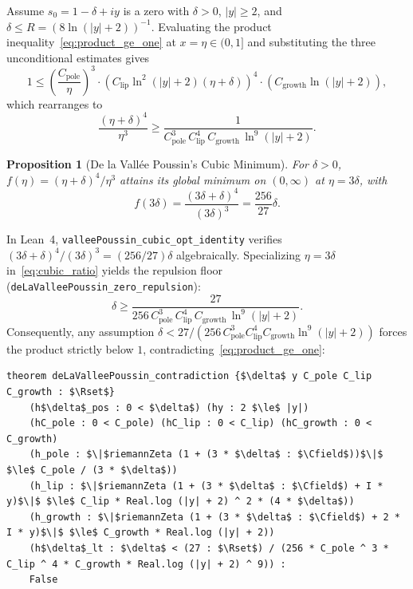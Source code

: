 \documentclass[11pt,a4paper]{article}
\newtheorem{proposition}[theorem]{Proposition}
\theoremstyle{definition}
\newcommand{\Rset}{\mathbb{R}}
\newcommand{\Cfield}{\mathbb{C}}
\begin{document}
Assume $s_0 = 1 - \delta + iy$ is a zero with $\delta > 0$, $|y| \ge 2$, and $\delta \le R = (8\ln(|y|+2))^{-1}$. Evaluating the product inequality~\eqref{eq:product_ge_one} at $x = \eta \in (0, 1]$ and substituting the three unconditional estimates gives
\begin{equation}
1 \le \left(\frac{C_{\text{pole}}}{\eta}\right)^3 \cdot \left(C_{\text{lip}} \ln^2(|y|+2) (\eta + \delta)\right)^4 \cdot \left(C_{\text{growth}} \ln(|y|+2)\right),
\end{equation}
which rearranges to
\begin{equation}\label{eq:cubic_ratio}
\frac{(\eta + \delta)^4}{\eta^3} \ge \frac{1}{C_{\text{pole}}^3 \, C_{\text{lip}}^4 \, C_{\text{growth}} \, \ln^9(|y|+2)}.
\end{equation}

\begin{proposition}[De la Vall{\'e}e Poussin's Cubic Minimum]\label{prop:cubic_opt}
For $\delta > 0$, $f(\eta) = (\eta+\delta)^4/\eta^3$ attains its global minimum on $(0,\infty)$ at $\eta = 3\delta$, with
\begin{equation}
f(3\delta) = \frac{(3\delta+\delta)^4}{(3\delta)^3} = \frac{256}{27}\delta.
\end{equation}
\end{proposition}
In Lean~4, \texttt{valleePoussin\_\allowbreak cubic\_opt\_identity} verifies $(3\delta + \delta)^4 / (3\delta)^3 = (256/27)\delta$ algebraically. Specializing $\eta = 3\delta$ in~\eqref{eq:cubic_ratio} yields the repulsion floor (\texttt{deLaValleePoussin\_\allowbreak zero\_repulsion}):
\begin{equation}
\delta \ge \frac{27}{256 \, C_{\text{pole}}^3 \, C_{\text{lip}}^4 \, C_{\text{growth}} \, \ln^9(|y|+2)}.
\end{equation}
Consequently, any assumption $\delta < 27 / (256\, C_{\text{pole}}^3 C_{\text{lip}}^4 C_{\text{growth}} \ln^9(|y|+2))$ forces the product strictly below $1$, contradicting~\eqref{eq:product_ge_one}:
\begin{lstlisting}
theorem deLaValleePoussin_contradiction {$\delta$ y C_pole C_lip C_growth : $\Rset$}
    (h$\delta$_pos : 0 < $\delta$) (hy : 2 $\le$ |y|)
    (hC_pole : 0 < C_pole) (hC_lip : 0 < C_lip) (hC_growth : 0 < C_growth)
    (h_pole : $\|$riemannZeta (1 + (3 * $\delta$ : $\Cfield$))$\|$ $\le$ C_pole / (3 * $\delta$))
    (h_lip : $\|$riemannZeta (1 + (3 * $\delta$ : $\Cfield$) + I * y)$\|$ $\le$ C_lip * Real.log (|y| + 2) ^ 2 * (4 * $\delta$))
    (h_growth : $\|$riemannZeta (1 + (3 * $\delta$ : $\Cfield$) + 2 * I * y)$\|$ $\le$ C_growth * Real.log (|y| + 2))
    (h$\delta$_lt : $\delta$ < (27 : $\Rset$) / (256 * C_pole ^ 3 * C_lip ^ 4 * C_growth * Real.log (|y| + 2) ^ 9)) :
    False
\end{lstlisting}
\end{document}
